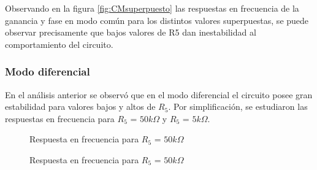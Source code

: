 Observando en la figura \ref{fig:CMsuperpuesto} las respuestas en frecuencia de la ganancia y fase en modo común para los distintos valores superpuestas, se puede observar precisamente que bajos valores de R5 dan inestabilidad al comportamiento del circuito.


\subsubsection{Modo diferencial}

En el análisis anterior se observó que en el modo diferencial el circuito posee gran estabilidad para valores bajos y altos de $R_{5}$. Por simplificación, se estudiaron las respuestas en frecuencia para $R_{5}$ = $50k\Omega$ y $R_{5}$ = $5k\Omega$.

\begin{figure}[H]
    \centering
    \hfill
    \caption{Respuesta en frecuencia para $R_{5}$ = $50k\Omega$}
  \end{figure}

  \begin{figure}[H]
    \centering
    \hfill
    \caption{Respuesta en frecuencia para $R_{5}$ = $50k\Omega$}
  \end{figure}

